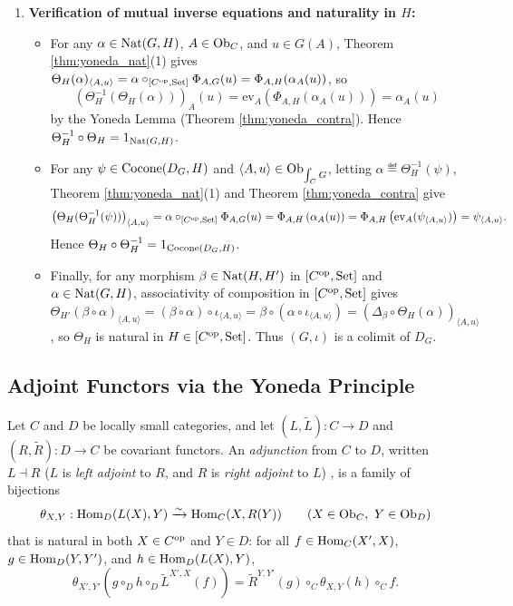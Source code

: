 \documentclass[10pt,a4paper]{article}
\begin{document}
\begin{enumerate}
\item \textbf{Verification of mutual inverse equations and naturality in $H$:}
\begin{itemize}
\item For any $\alpha \in {\textrm{Nat}}(G, H)$, $A \in {\textrm{Ob}}_C$, and $u \in G(A)$, Theorem \ref{thm:yoneda_nat}(1) gives $\Theta_H(\alpha)_{\langle A,u\rangle} = \alpha \circ_{[C^{\textrm{op}},{\textrm{Set}}]} \Phi_{A,G}(u) = \Phi_{A,H}(\alpha_A(u))$, so
$$\left(\Theta_H^{-1}(\Theta_H(\alpha))\right)_A(u) = \mathrm{ev}_A\left(\Phi_{A,H}(\alpha_A(u))\right) = \alpha_A(u)$$
by the Yoneda Lemma (Theorem \ref{thm:yoneda_contra}). Hence $\Theta_H^{-1} \circ \Theta_H = 1_{{\textrm{Nat}}(G,H)}$.
\item For any $\psi \in {\mathrm{Cocone}}(D_G, H)$ and $\langle A, u \rangle \in {\textrm{Ob}}_{\int_C G}$, letting $\alpha \eqdef \Theta_H^{-1}(\psi)$, Theorem \ref{thm:yoneda_nat}(1) and Theorem \ref{thm:yoneda_contra} give
$$\left(\Theta_H(\Theta_H^{-1}(\psi))\right)_{\langle A, u \rangle} = \alpha \circ_{[C^{\textrm{op}},{\textrm{Set}}]} \Phi_{A,G}(u) = \Phi_{A,H}\left(\alpha_A(u)\right) = \Phi_{A,H}\left(\mathrm{ev}_A(\psi_{\langle A, u \rangle})\right) = \psi_{\langle A, u \rangle}.$$
Hence $\Theta_H \circ \Theta_H^{-1} = 1_{{\mathrm{Cocone}}(D_G,H)}$.
\item Finally, for any morphism $\beta \in {\textrm{Nat}}(H, H')$ in $[C^{\textrm{op}}, {\textrm{Set}}]$ and $\alpha \in {\textrm{Nat}}(G, H)$, associativity of composition in $[C^{\textrm{op}}, {\textrm{Set}}]$ gives $\Theta_{H'}(\beta \circ \alpha)_{\langle A, u \rangle} = (\beta \circ \alpha) \circ \iota_{\langle A, u \rangle} = \beta \circ (\alpha \circ \iota_{\langle A, u \rangle}) = (\Delta_\beta \circ \Theta_H(\alpha))_{\langle A, u \rangle}$, so $\Theta_H$ is natural in $H \in [C^{\textrm{op}}, {\textrm{Set}}]$. Thus $(G, \iota)$ is a colimit of $D_G$.
\end{itemize}
\end{enumerate}
\myqed

\subsection{Adjoint Functors via the Yoneda Principle}\label{sec:adjunctions}
\begin{definition}\label{def:adjunction}
Let $C$ and $D$ be locally small categories, and let $(L, \widetilde{L}) : C \to D$ and $(R, \widetilde{R}) : D \to C$ be covariant functors. An \emph{adjunction} from $C$ to $D$, written $L \dashv R$ ($L$ is \emph{left adjoint} to $R$, and $R$ is \emph{right adjoint} to $L$) \cite{MacLane1998,Riehl2016,Awodey2010}, is a family of bijections
$$\theta_{X,Y} : {\textrm{Hom}}_D(L(X), Y) \xrightarrow{\sim} {\textrm{Hom}}_C(X, R(Y)) \qquad (X \in {\textrm{Ob}}_C,\ Y \in {\textrm{Ob}}_D)$$
that is natural in both $X \in C^{\textrm{op}}$ and $Y \in D$: for all $f \in {\textrm{Hom}}_C(X', X)$, $g \in {\textrm{Hom}}_D(Y, Y')$, and $h \in {\textrm{Hom}}_D(L(X), Y)$,
$$\theta_{X', Y'}\left(g \circ_D h \circ_D \widetilde{L}^{X',X}(f)\right) = \widetilde{R}^{Y,Y'}(g) \circ_C \theta_{X,Y}(h) \circ_C f.$$
\end{definition}
\end{document}
